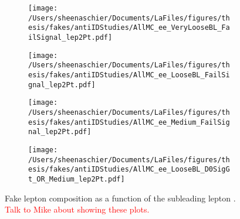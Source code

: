  \begin{figure}
 \centering
 \iffalse
 \begin{subfigure}[b]{0.47\textwidth}
    \texttt{[image: /Users/sheenaschier/Documents/LaFiles/figures/thesis/fakes/antiIDStudies/AllMC\_ee\_SR\_lep2Pt.pdf]}
    \end{subfigure}
     \begin{subfigure}[b]{0.47\textwidth}
  \texttt{[image: /Users/sheenaschier/Documents/LaFiles/figures/thesis/fakes/antiIDStudies/AllMC\_ee\_VeryLoose\_FailSignal\_lep2Pt.pdf]}
 \end{subfigure}
 \fi
  \begin{subfigure}[b]{0.47\textwidth}
     \texttt{[image: /Users/sheenaschier/Documents/LaFiles/figures/thesis/fakes/antiIDStudies/AllMC\_ee\_VeryLooseBL\_FailSignal\_lep2Pt.pdf]}
 \end{subfigure}
   \begin{subfigure}[b]{0.47\textwidth}
     \texttt{[image: /Users/sheenaschier/Documents/LaFiles/figures/thesis/fakes/antiIDStudies/AllMC\_ee\_LooseBL\_FailSignal\_lep2Pt.pdf]}
 \end{subfigure}       
    \begin{subfigure}[b]{0.46\textwidth}
     \texttt{[image: /Users/sheenaschier/Documents/LaFiles/figures/thesis/fakes/antiIDStudies/AllMC\_ee\_Medium\_FailSignal\_lep2Pt.pdf]}
 \end{subfigure}
    \begin{subfigure}[b]{0.46\textwidth}
     \texttt{[image: /Users/sheenaschier/Documents/LaFiles/figures/thesis/fakes/antiIDStudies/AllMC\_ee\_LooseBL\_D0SigGt\_OR\_Medium\_lep2Pt.pdf]}
 \end{subfigure} 
 
    \caption{Fake lepton composition as a function of the subleading lepton \pt. \textcolor{red}{Talk to Mike about showing these plots.} }
 \label{fig:LeptonIDComposition}
\end{figure}


